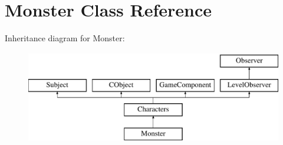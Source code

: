 \hypertarget{class_monster}{}\section{Monster Class Reference}
\label{class_monster}
Inheritance diagram for Monster\+:\begin{figure}[H]
\begin{center}
\leavevmode
\includegraphics[height=4.000000cm]{class_monster}
\end{center}
\end{figure}
